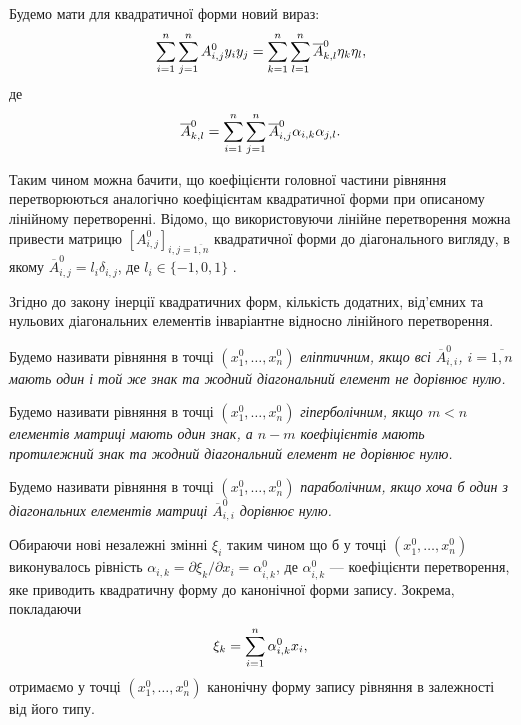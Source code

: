 Будемо мати для квадратичної форми новий вираз:
\begin{equation}
	\displaystyle\sum\limits_{i=1}^n \displaystyle\sum\limits_{j=1}^n A_{i,j}^0 y_iy_j = \displaystyle\sum\limits_{k=1}^n\displaystyle\sum\limits_{l=1}^n \overline{A}_{k,l}^0 \eta_k \eta_l,
\end{equation}
де 
\begin{equation}
	\overline{A}_{k,l}^0 = \displaystyle\sum\limits_{i=1}^n \displaystyle\sum\limits_{j=1}^n \overline{A}_{i,j}^0 \alpha_{i,k}\alpha_{j,l}.
\end{equation}

Таким чином можна бачити, що коефіцієнти головної частини рівняння перетворюються аналогічно коефіцієнтам квадратичної форми при описаному лінійному перетворенні. Відомо, що використовуючи лінійне перетворення можна привести матрицю $\left[A_{i,j}^0\right]_{i,j=\overline{1,n}}$ квадратичної форми до діагонального вигляду, в якому $\overline{A}_{i,j}^0 = l_i\delta_{i,j}$, де  $l_i \in \{-1,0,1\}$  . \medskip

Згідно до закону інерції квадратичних форм, кількість додатних, від'ємних та нульових діагональних елементів інваріантне відносно лінійного перетворення.

\begin{definition}
	Будемо називати рівняння в точці $(x_1^0,\ldots,x_n^0)$ \it{еліптичним}, якщо всі $\overline{A}_{i,i}^0$, $i=\overline{1,n}$ мають один і той же знак  та жодний діагональний елемент не дорівнює нулю. 
\end{definition}

\begin{definition}
	Будемо називати рівняння в точці $(x_1^0,\ldots,x_n^0)$ \it{гіперболічним}, якщо $m < n$ елементів матриці мають один знак, а $n - m$ коефіцієнтів мають протилежний знак та жодний діагональний елемент не дорівнює нулю. 
\end{definition}

\begin{definition}
	Будемо називати рівняння в точці $(x_1^0,\ldots,x_n^0)$ \it{параболічним}, якщо хоча б один з діагональних елементів матриці $\overline{A}_{i,i}^0$ дорівнює нулю. 
\end{definition}

Обираючи нові незалежні змінні $\xi_i$ таким чином що б у точці $(x_1^0,\ldots,x_n^0)$ виконувалось рівність $\alpha_{i,k}= \partial \xi_k / \partial x_i = \alpha_{i,k}^0$, де $\alpha_{i,k}^0$ --- коефіцієнти перетворення, яке приводить квадратичну форму до канонічної форми запису. Зокрема, покладаючи
\begin{equation}
	\xi_k = \displaystyle\sum\limits_{i=1}^n \alpha_{i,k}^0 x_i,
\end{equation}
отримаємо у точці $(x_1^0,\ldots,x_n^0)$ канонічну форму запису рівняння в залежності від його типу.

